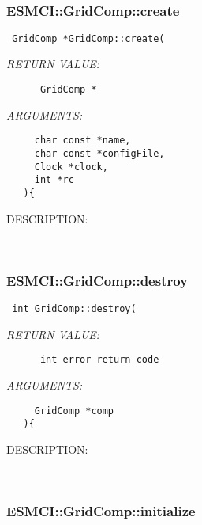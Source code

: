    
 
\mbox{}\hrulefill\
 
\subsubsection [ESMCI::GridComp::create] {ESMCI::GridComp::create}


  
\begin{verbatim} GridComp *GridComp::create(\end{verbatim}{\em RETURN VALUE:}
\begin{verbatim}      GridComp *\end{verbatim}{\em ARGUMENTS:}
\begin{verbatim}     char const *name,
     char const *configFile,
     Clock *clock,
     int *rc
   ){\end{verbatim}
{\sf DESCRIPTION:\\ }


   
 
\mbox{}\hrulefill\
 
\subsubsection [ESMCI::GridComp::destroy] {ESMCI::GridComp::destroy}


  
\begin{verbatim} int GridComp::destroy(\end{verbatim}{\em RETURN VALUE:}
\begin{verbatim}      int error return code\end{verbatim}{\em ARGUMENTS:}
\begin{verbatim}     GridComp *comp
   ){\end{verbatim}
{\sf DESCRIPTION:\\ }


   
 
\mbox{}\hrulefill\
 
\subsubsection [ESMCI::GridComp::initialize] {ESMCI::GridComp::initialize}



